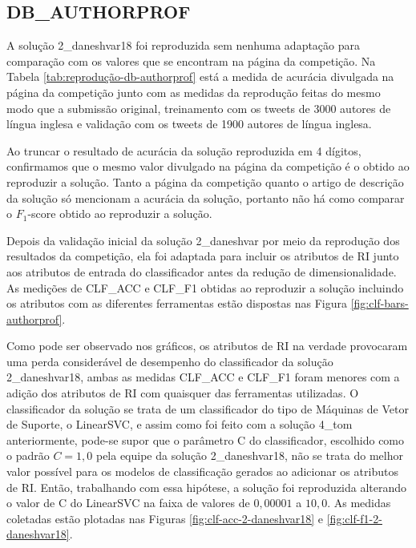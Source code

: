 		\subsection{DB\_AUTHORPROF}
			A solução 2\_daneshvar18 foi reproduzida sem nenhuma adaptação para comparação com os valores que se encontram na página da competição.
			Na Tabela \ref{tab:reprodução-db-authorprof} está a medida de acurácia divulgada na página da competição \cite{PAN_APCLEF_2018} junto com as medidas da reprodução feitas do mesmo modo que a submissão original, treinamento com os tweets de 3000 autores de língua inglesa e validação com os tweets de 1900 autores de língua inglesa.

			

			Ao truncar o resultado de acurácia da solução reproduzida em 4 dígitos, confirmamos que o mesmo valor divulgado na página da competição é o obtido ao reproduzir a solução.
			Tanto a página da competição quanto o artigo de descrição da solução \cite{daneshvar:2018} só mencionam a acurácia da solução, portanto não há como comparar o $F_1$-score obtido ao reproduzir a solução.

			Depois da validação inicial da solução 2\_daneshvar por meio da reprodução dos resultados da competição, ela foi adaptada para incluir os atributos de RI junto aos atributos de entrada do classificador antes da redução de dimensionalidade.
			As medições de CLF\_ACC e CLF\_F1 obtidas ao reproduzir a solução incluindo os atributos com as diferentes ferramentas estão dispostas nas Figura \ref{fig:clf-bars-authorprof}.

			




			Como pode ser observado nos gráficos, os atributos de RI na verdade provocaram uma perda considerável de desempenho do classificador da solução 2\_daneshvar18, ambas as medidas CLF\_ACC e CLF\_F1 foram menores com a adição dos atributos de RI com quaisquer das ferramentas utilizadas.
			O classificador da solução se trata de um classificador do tipo de Máquinas de Vetor de Suporte, o LinearSVC, e assim como foi feito com a solução 4\_tom anteriormente, pode-se supor que o parâmetro C do classificador, escolhido como o padrão $C = 1,0$ pela equipe da solução 2\_daneshvar18, não se trata do melhor valor possível para os modelos de classificação gerados ao adicionar os atributos de RI.
			Então, trabalhando com essa hipótese, a solução foi reproduzida alterando o valor de C do LinearSVC na faixa de valores de $0,00001$ a $10,0$.
			As medidas coletadas estão plotadas nas Figuras \ref{fig:clf-acc-2-daneshvar18} e \ref{fig:clf-f1-2-daneshvar18}.


